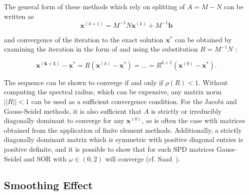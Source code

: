 
The general form of these methods which rely on splitting of $A = M - N$ can be written as
\begin{equation}
	\mathbf{x}^{(k+1)} = M^{-1}N\mathbf{x}^{(k)} + M^{-1}\mathbf{b}
\end{equation}

and convergence of the iteration to the exact solution $\mathbf{x}^*$ can be obtained by examining the iteration in the form of and using the substitution $R = M^{-1}N $ :

\begin{equation}
	\mathbf{x^{(k+1)}} - \mathbf{x}^* = R\left(\mathbf{x}^{(k)} - \mathbf{x}^* \right) = \ldots = R^{k+1}\left(\mathbf{x}^{(0)} - \mathbf{x}^* \right).
\end{equation}


The sequence can be shown to converge if and only if $\rho\left( R \right) < 1$. Without computing the spectral radius, which can be expensive, any matrix norm $|| R || < 1$ can be used as a sufficient convergence condition. For the Jacobi and Gauss-Seidel methods, it is also sufficient that $A$ is strictly or irreducibly diagonally dominant to converge for any $\mathbf{x}^{(0)}$, as is often the case with matrices obtained from the application of finite element methods. Additionally, a strictly diagonally dominant matrix which is symmetric with positive diagonal entries is positive definite, and it is possible to show that for such SPD matrices Gauss-Seidel and SOR with $\omega \in (0, 2)$ will converge (cf. Saad~\cite{Saad2003}).


%

\subsection{Smoothing Effect}

